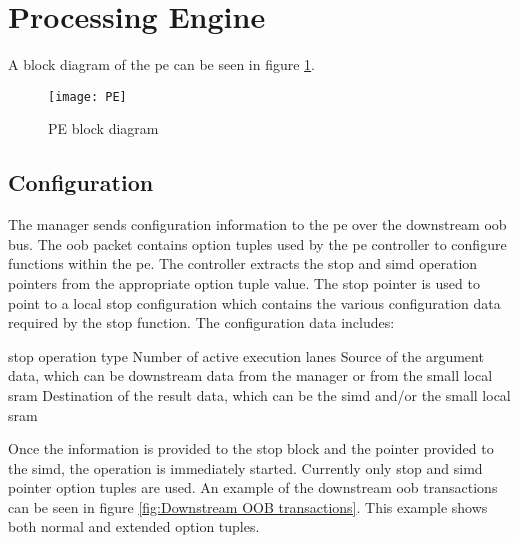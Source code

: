 \section{Processing Engine}
\label{sec:pe}

A block diagram of the \ac{pe} can be seen in figure \ref{fig:PE block diagram}.
\begin{figure}[h]
\centering
\captionsetup{justification=centering}
\captionsetup{width=.9\linewidth}
\centerline{
\mbox{\texttt{[image: PE]}}
}
\center\caption{PE block diagram}
\label{fig:PE block diagram}
\end{figure}

\subsection{Configuration}
\label{sec:peConfiguration}

The manager sends configuration information to the \ac{pe} over the downstream \ac{oob} bus.
The \ac{oob} packet contains option tuples used by the \ac{pe} controller to configure functions within the \ac{pe}.
The controller extracts the \ac{stop} and \ac{simd} operation pointers from the appropriate option tuple value.
The \ac{stop} pointer is used to point to a local \ac{stop} configuration which contains the various configuration data required by the \ac{stop} function.
The configuration data includes:
\begin{outline}
    \1 \ac{stop} operation type
    \1 Number of active execution lanes
    \1 Source of the argument data, which can be downstream data from the manager or from the small local \ac{sram}
    \1 Destination of the result data, which can be the \ac{simd} and/or the small local \ac{sram}
\end{outline}
Once the information is provided to the \ac{stop} block and the pointer provided to the \ac{simd}, the operation is immediately started.
Currently only \ac{stop} and \ac{simd} pointer option tuples are used.
An example of the downstream \ac{oob} transactions can be seen in figure \ref{fig:Downstream OOB transactions}. This example shows both normal and extended option tuples.

